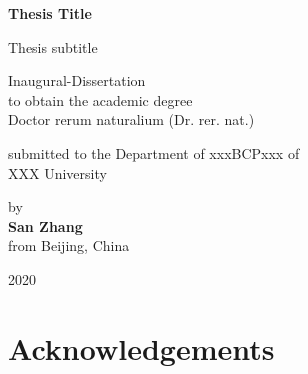 \documentclass[12pt,openright]{book}
\begin{document}

\begin{titlepage}
\begin{center}
  \vspace*{1cm}

  \Huge \textbf {Thesis Title}

  \vspace{0.5cm}

  \Large{Thesis subtitle}

  \vspace{2cm}

  \large{Inaugural-Dissertation \\ to obtain the academic degree \\ Doctor rerum naturalium (Dr. rer. nat.)}

  \vspace{1.5cm}

  \large{submitted to the Department of xxxBCPxxx of \\ XXX University}

  \vspace{1.5cm}


  \vfill

  \large{by \\ \textbf{San Zhang} \\ from Beijing, China}
  
  \vspace{0.5cm}

  \large{2020}
  

\end{center}
\end{titlepage}

\pagestyle{empty}
\tableofcontents
\clearpage

\pagestyle{fancy-stylename}

\frontmatter

\chapter*{Acknowledgements}
\lipsum[1-5]
\end{document}
